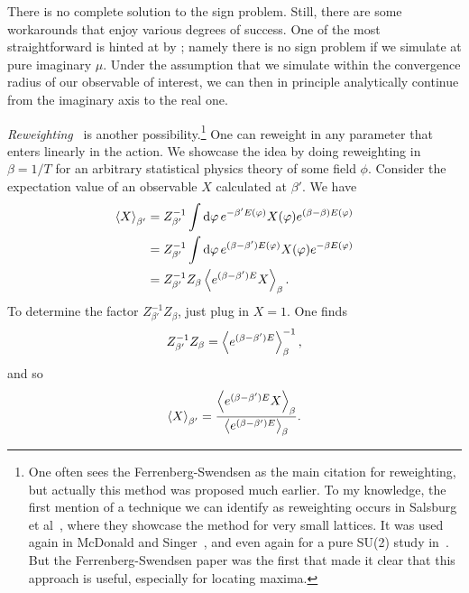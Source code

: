 There is no complete solution to the sign problem. Still, there are
some workarounds that enjoy various degrees of success.
One of the most straightforward is hinted at by
; namely there is no sign problem
if we simulate at pure imaginary $\mu$. Under the assumption
that we simulate within the convergence radius of our
observable of interest, we can then in principle analytically
continue from the imaginary axis to the real one.

{\it Reweighting}~\cite{ferrenberg_new_1989}
is another possibility.\footnote{One often sees the Ferrenberg-Swendsen as the
main citation for reweighting, but actually this method was proposed much
earlier. To my knowledge, the first mention of a technique we can identify as
reweighting occurs in Salsburg et al~\cite{salsburg_application_1959}, where
they showcase the method for very small lattices. It was used again in
McDonald and Singer~\cite{mcdonald_calculation_1967}, and even again for
a pure SU(2) study in~\cite{falcioni_complex_1982}. But the Ferrenberg-Swendsen
paper was the first that made it clear that this approach is useful, especially
for locating maxima.} One can reweight in any parameter that
enters linearly in the action. 
We showcase the idea by doing reweighting in $\beta=1/T$ for
an arbitrary statistical physics theory of some field $\phi$. Consider
the expectation value of an observable $X$ calculated at $\beta'$. We have
\begin{equation}
\begin{aligned}
  \ev{X}_{\beta'}&=Z_{\beta'}^{-1}\int\dd{\phi}e^{-\beta'E(\phi)}X(\phi)
                  e^{(\beta-\beta)E(\phi)}\\
                 &=Z_{\beta'}^{-1}\int\dd{\phi}e^{(\beta-\beta')E(\phi)}
                  X(\phi)e^{-\beta E(\phi)}\\
                 &=Z_{\beta'}^{-1}Z_{\beta}\ev{e^{(\beta-\beta')E}X}_\beta.
\end{aligned}
\end{equation}
To determine the factor $Z_{\beta'}^{-1}Z_{\beta}$, just plug in $X=1$.
One finds
\begin{equation}
Z_{\beta'}^{-1}Z_{\beta}=\ev{e^{(\beta-\beta')E}}_{\beta}^{-1},
\end{equation}
and so
\begin{equation}\label{eq:RW}
\ev{X}_{\beta'}=\frac{\ev{e^{(\beta-\beta')E}X}_\beta}{\ev{e^{(\beta-\beta')E}}_{\beta}}.
\end{equation}



